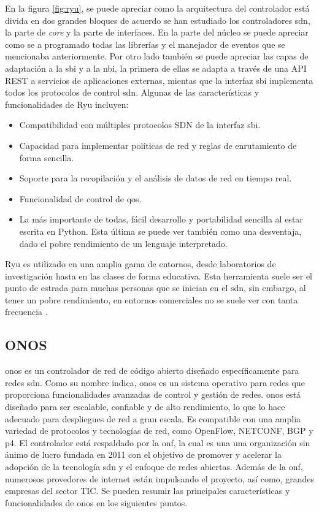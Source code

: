 En la figura \ref*{fig:ryu}, se puede apreciar como la arquitectura del controlador está divida en dos grandes bloques de acuerdo se han estudiado los controladores \gls{sdn}, la parte de \textit{core} y la parte de interfaces. En la parte del núcleo se puede apreciar como se a programado todas las librerías y el manejador de eventos que se mencionaba anteriormente. Por otro lado también se puede apreciar las capas de adaptación a la \gls{sbi} y a la \gls{nbi}, la primera de ellas se adapta a través de una API REST a servicios de aplicaciones externas, mientas que la interfaz \gls{sbi} implementa todos los protocolos de control \gls{sdn}. Algunas de las características y funcionalidades de Ryu incluyen:

\begin{itemize}
    \item Compatibilidad con múltiples protocolos SDN de la interfaz \gls{sbi}.
    \item Capacidad para implementar políticas de red y reglas de enrutamiento de forma sencilla.
    \item Soporte para la recopilación y el análisis de datos de red en tiempo real.
    \item Funcionalidad de control de \gls{qos}.
    \item La más importante de todas, fácil desarrollo y portabilidad sencilla al estar escrita en Python. Esta última se puede ver también como una desventaja, dado el pobre rendimiento de un lenguaje interpretado.
\end{itemize}

Ryu es utilizado en una amplia gama de entornos, desde laboratorios de investigación hasta en las clases de forma educativa. Esta herramienta suele ser el punto de estrada para muchas personas que se inician en el \gls{sdn}, sin embargo, al tener un pobre rendimiento, en entornos comerciales no se suele ver con tanta frecuencia \cite{tomonori2013introduction}.

\subsection{ONOS}
\label{subsec:ONOS}

\gls{onos} es un controlador de red de código abierto diseñado específicamente para redes \gls{sdn}. Como su nombre indica, \gls{onos} es un sistema operativo para redes que proporciona funcionalidades avanzadas de control y gestión de redes. \gls{onos} está diseñado para ser escalable, confiable y de alto rendimiento, lo que lo hace adecuado para despliegues de red a gran escala. Es compatible con una amplia variedad de protocolos y tecnologías de red, como OpenFlow, NETCONF, BGP y \gls{p4}. El controlador está respaldado por la \gls{onf}, la cual es una una organización sin ánimo de lucro fundada en 2011 con el objetivo de promover y acelerar la adopción de la tecnología \gls{sdn} y el enfoque de redes abiertas. Además de la \gls{onf}, numerosos provedores de internet están impulsando el proyecto, así como, grandes empresas del sector TIC. Se pueden resumir las principales características y funcionalidades de \gls{onos} en los siguientes puntos.

